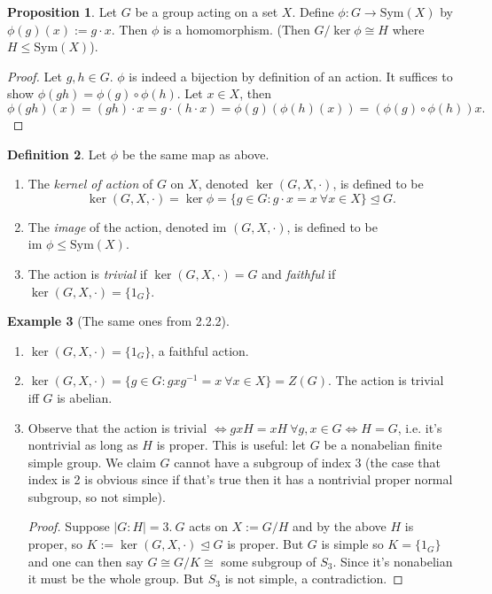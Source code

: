 \documentclass[a4paper]{article}
\newcommand{\Sym}{\text{Sym}}
\newcommand{\im}{\text{im }}
\theoremstyle{definition}
\newtheorem{defn}{Definition}[subsection]
\newtheorem{prop}[defn]{Proposition}
\newtheorem{example}[defn]{Example}
\begin{document}
\begin{prop}
Let $G$ be a group acting on a set $X$. Define $\phi:G\rightarrow\Sym(X)$ by $\phi(g)(x):=g\cdot x$. Then $\phi$ is a homomorphism. (Then $G/\ker\phi\cong H$ where $H\leq \Sym(X)$).
\end{prop}
\begin{proof}
Let $g,h\in G$. $\phi$ is indeed a bijection by definition of an action. It suffices to show $\phi(gh)=\phi(g)\circ\phi(h)$. Let $x\in X$, then
\[
\phi(gh)(x)=(gh)\cdot x = g\cdot(h\cdot x)=\phi(g)(\phi(h)(x))=(\phi(g)\circ\phi(h))x.
\]
\end{proof}

\begin{defn}
Let $\phi$ be the same map as above.
\begin{enumerate}
\item The \textit{kernel of action} of $G$ on $X$, denoted $\ker(G,X,\cdot)$, is defined to be
\[
\ker(G,X,\cdot)=\ker\phi=\{g\in G:g\cdot x=x \ \forall x\in X\} \unlhd G.
\]
\item The \textit{image} of the action, denoted $\im(G,X,\cdot)$, is defined to be $\im\phi\leq\Sym(X)$.
\item The action is \textit{trivial} if $\ker(G,X,\cdot)=G$ and \textit{faithful} if $\ker(G,X,\cdot)=\{1_G\}$.
\end{enumerate}
\end{defn}

\begin{example}[The same ones from 2.2.2]
\begin{enumerate}
\item $\ker(G,X,\cdot)=\{1_G\}$, a faithful action.
\item $\ker(G,X,\cdot)=\{g\in G:gxg^{-1}=x \ \forall x\in X\}=Z(G)$. The action is trivial iff $G$ is abelian.
\item Observe that the action is trivial $\Leftrightarrow gxH=xH \ \forall g,x\in G\Leftrightarrow H=G$, i.e. it's nontrivial as long as $H$ is proper. This is useful: let $G$ be a nonabelian finite simple group. We claim $G$ cannot have a subgroup of index 3 (the case that index is 2 is obvious since if that's true then it has a nontrivial proper normal subgroup, so not simple).
\begin{proof}
Suppose $|G:H|=3.\ G$ acts on $X:=G/H$ and by the above $H$ is proper, so $K:=\ker(G,X,\cdot) \unlhd G$ is proper. But $G$ is simple so $K=\{1_G\}$ and one can then say $G\cong G/K\cong$ some subgroup of $S_3$. Since it's nonabelian it must be the whole group. But $S_3$ is not simple, a contradiction. 
\end{proof}
\end{enumerate}
\end{example}
\end{document}
